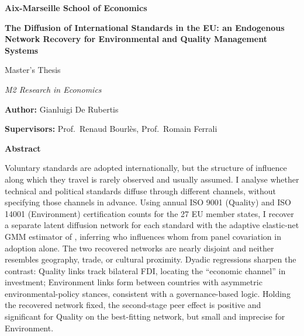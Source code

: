 \documentclass[12pt,a4paper]{article}
\begin{document}
\begin{titlepage}
    \centering
    \vspace*{2cm}

    {\Large\bfseries Aix-Marseille School of Economics\par}

    \vspace{1.5cm}

    {\LARGE\bfseries The Diffusion of International Standards in the EU: an Endogenous Network Recovery for Environmental and Quality Management Systems\par}

    \vspace{2cm}

    {\large Master's Thesis\par}
    \vspace{0.4cm}
    {\large\itshape M2 Research in Economics\par}

    \vspace{2.5cm}

    {\large \textbf{Author:} Gianluigi De Rubertis\par}
    \vspace{0.6cm}
    {\large \textbf{Supervisors:} Prof.\ Renaud Bourlès, Prof.\ Romain Ferrali\par}

    \vfill

\end{titlepage}

\thispagestyle{plain}
\vspace*{3cm}

\begin{center}
    {\Large\bfseries Abstract}
\end{center}

\vspace{0.8cm}

\noindent Voluntary standards are adopted internationally, but the structure of influence along which they travel is rarely observed and usually assumed. I analyse whether technical and political standards diffuse through different channels, without specifying those channels in advance. Using annual ISO 9001 (Quality) and ISO 14001 (Environment) certification counts for the 27 EU member states, I recover a separate latent diffusion network for each standard with the adaptive elastic-net GMM estimator of \citet{depaula2025}, inferring who influences whom from panel covariation in adoption alone. The two recovered networks are nearly disjoint and neither resembles geography, trade, or cultural proximity. Dyadic regressions sharpen the contrast: Quality links track bilateral FDI, locating the ``economic channel'' in investment; Environment links form between countries with asymmetric environmental-policy stances, consistent with a governance-based logic. Holding the recovered network fixed, the second-stage peer effect is positive and significant for Quality on the best-fitting network, but small and imprecise for Environment.
\vspace{0.5cm}
\end{document}
